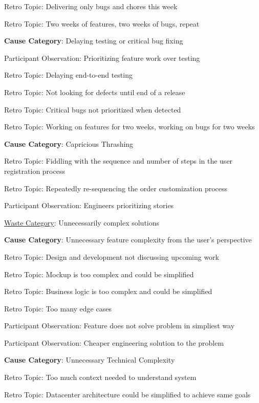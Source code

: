 \quad \quad Retro Topic: Delivering only bugs and chores this week

\quad \quad Retro Topic: Two weeks of features, two weeks of bugs, repeat

\quad \textbf{Cause Category}: Delaying testing or critical bug fixing

\quad \quad Participant Observation: Prioritizing feature work over testing

\quad \quad Retro Topic: Delaying end-to-end testing

\quad \quad Retro Topic: Not looking for defects until end of a release

\quad \quad Retro Topic: Critical bugs not prioritized when detected

\quad \quad Retro Topic: Working on features for two weeks, working on bugs for two weeks

\quad \textbf{Cause Category}: Capricious Thrashing

\quad \quad Retro Topic: Fiddling with the sequence and number of steps in the user registration process

\quad \quad Retro Topic: Repeatedly re-sequencing the order customization process

\quad Participant Observation: Engineers prioritizing stories





\underline{Waste Category}: Unnecessarily complex solutions

\quad \textbf{Cause Category}: Unnecessary feature complexity from the user's perspective

\quad \quad Retro Topic: Design and development not discussing upcoming work

\quad \quad Retro Topic: Mockup is too complex and could be simplified

\quad \quad Retro Topic: Business logic is too complex and could be simplified

\quad \quad Retro Topic: Too many edge cases

\quad \quad Participant Observation: Feature does not solve problem in simpliest way

\quad \quad Participant Observation: Cheaper engineering solution to the  problem

\quad \textbf{Cause Category}: Unnecessary Technical Complexity

\quad \quad Retro Topic: Too much context needed to understand system

\quad \quad Retro Topic: Datacenter architecture could be simplified to achieve same goals

